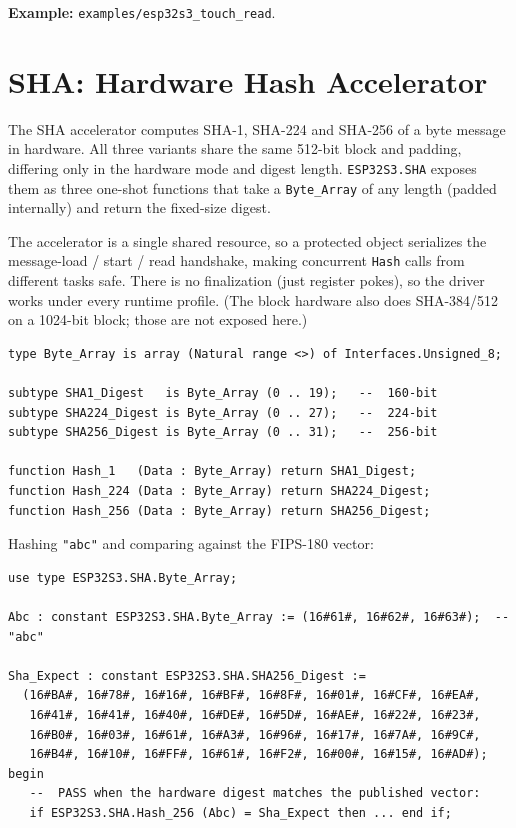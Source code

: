 \noindent\textbf{Example:} \texttt{examples/esp32s3\_touch\_read}.

\section{SHA: Hardware Hash Accelerator}
\label{app:int:sha}

The SHA accelerator computes SHA-1, SHA-224 and SHA-256 of a byte message in
hardware. All three variants share the same 512-bit block and padding, differing
only in the hardware mode and digest length. \texttt{ESP32S3.SHA} exposes them as
three one-shot functions that take a \texttt{Byte\_Array} of any length (padded
internally) and return the fixed-size digest.

The accelerator is a single shared resource, so a protected object serializes the
message-load / start / read handshake, making concurrent \texttt{Hash} calls from
different tasks safe. There is no finalization (just register pokes), so the
driver works under every runtime profile. (The block hardware also does
SHA-384/512 on a 1024-bit block; those are not exposed here.)

\begin{lstlisting}
type Byte_Array is array (Natural range <>) of Interfaces.Unsigned_8;

subtype SHA1_Digest   is Byte_Array (0 .. 19);   --  160-bit
subtype SHA224_Digest is Byte_Array (0 .. 27);   --  224-bit
subtype SHA256_Digest is Byte_Array (0 .. 31);   --  256-bit

function Hash_1   (Data : Byte_Array) return SHA1_Digest;
function Hash_224 (Data : Byte_Array) return SHA224_Digest;
function Hash_256 (Data : Byte_Array) return SHA256_Digest;
\end{lstlisting}

Hashing \texttt{"abc"} and comparing against the FIPS-180 vector:

\begin{lstlisting}
use type ESP32S3.SHA.Byte_Array;

Abc : constant ESP32S3.SHA.Byte_Array := (16#61#, 16#62#, 16#63#);  --  "abc"

Sha_Expect : constant ESP32S3.SHA.SHA256_Digest :=
  (16#BA#, 16#78#, 16#16#, 16#BF#, 16#8F#, 16#01#, 16#CF#, 16#EA#,
   16#41#, 16#41#, 16#40#, 16#DE#, 16#5D#, 16#AE#, 16#22#, 16#23#,
   16#B0#, 16#03#, 16#61#, 16#A3#, 16#96#, 16#17#, 16#7A#, 16#9C#,
   16#B4#, 16#10#, 16#FF#, 16#61#, 16#F2#, 16#00#, 16#15#, 16#AD#);
begin
   --  PASS when the hardware digest matches the published vector:
   if ESP32S3.SHA.Hash_256 (Abc) = Sha_Expect then ... end if;
\end{lstlisting}

